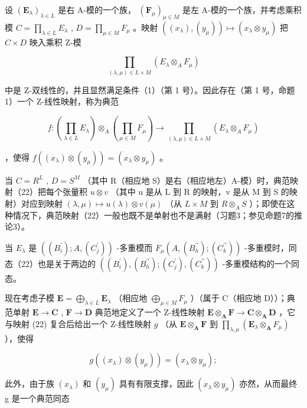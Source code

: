 设 \((\mathbf{E}_{\lambda})_{\lambda \in L}\) 是右 A-模的一个族， \((\mathbf{F}_{\mu})_{\mu \in M}\) 是左 A-模的一个族，并考虑乘积模 \(C = \prod_{\lambda \in L} E_{\lambda}\) , \(D = \prod_{\mu \in M} F_{\mu}\) 。映射 \(((x_{\lambda}), (y_{\mu})) \mapsto (x_{\lambda} \otimes y_{\mu})\) 把 \(C \times D\) 映入乘积 Z-模

\[
\prod_ {(\lambda , \mu) \in L \times M} (E _ {\lambda} \otimes_ {A} F _ {\mu})
\]

中是 Z-双线性的，并且显然满足条件（1）（第 1 号）。因此存在（第 1 号，命题 1）一个 Z-线性映射，称为典范

\[
f: \left(\prod_ {\lambda \in L} E _ {\lambda}\right) \otimes_ {A} \left(\prod_ {\mu \in M} F _ {\mu}\right)\rightarrow \prod_ {(\lambda , \mu) \in L \times M} (E _ {\lambda} \otimes_ {A} F _ {\mu})\tag{22}
\]

，使得 \(f((x_{\lambda}) \otimes (y_{\mu})) = (x_{\lambda} \otimes y_{\mu})\) 。

当 \(C = R^{L}\) , \(D = S^{M}\) （其中 R（相应地 S）是右（相应地左）A-模）时，典范映射（22）把每个张量积 \(u \otimes v\) （其中 u 是从 L 到 R 的映射，v 是从 M 到 S 的映射）对应到映射 \((\lambda, \mu) \mapsto u(\lambda) \otimes v(\mu)\) （从 \(L \times M\) 到 \(R \otimes_{A} S\) ）；即使在这种情况下，典范映射（22）一般也既不是单射也不是满射（习题3；参见命题7的推论3）。

当 \(E_{\lambda}\) 是 \(((B_{i}^{\prime}); A, (C_{j}^{\prime}))\) -多重模而 \(F_{\mu}(A, (B_{h}^{\prime\prime}); (C_{k}^{\prime\prime}))\) -多重模时，同态（22）也是关于两边的 \(((B_{i}^{\prime}), (B_{h}^{\prime\prime}); (C_{j}^{\prime}), (C_{k}^{\prime\prime}))\) -多重模结构的一个同态。

现在考虑子模 \(\mathbf{E} = \bigoplus_{\lambda \in L} \mathbf{E}_{\lambda}\) （相应地 \(\bigoplus_{\mu \in M} F_{\mu}\) ）（属于 C（相应地 D））；典范单射 \(\mathbf{E} \to \mathbf{C}\) , \(\mathbf{F} \to \mathbf{D}\) 典范地定义了一个 Z-线性映射 \(\mathbf{E} \otimes_{\mathbf{A}} \mathbf{F} \to \mathbf{C} \otimes_{\mathbf{A}} \mathbf{D}\) ，它与映射 (22) 复合后给出一个 Z-线性映射 \(g\) （从 \(\mathbf{E} \otimes_{\mathbf{A}} \mathbf{F}\) 到 \(\prod_{\lambda, \mu} (\mathbf{E}_{\lambda} \otimes_{\mathbf{A}} F_{\mu})\) ），使得

\[
g ((x _ {\lambda}) \otimes (y _ {\mu})) = (x _ {\lambda} \otimes y _ {\mu});
\]

此外，由于族 \((x_{\lambda})\) 和 \((y_{\mu})\) 具有有限支撑，因此 \((x_{\lambda} \otimes y_{\mu})\) 亦然，从而最终 g 是一个典范同态

